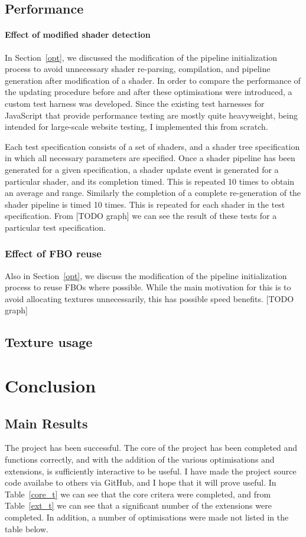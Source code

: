 \documentclass[12pt,twoside,notitlepage]{report}
\begin{document}
\section{Performance}
\subsubsection{Effect of modified shader detection}
In Section~\ref{opt}, we discussed the modification of the pipeline initialization process to avoid unnecessary shader re-parsing, compilation, and pipeline generation after modification of a shader. In order to compare the performance of the updating procedure before and after these optimisations were introduced, a custom test harness was developed. Since the existing test harnesses for JavaScript that provide performance testing are mostly quite heavyweight, being intended for large-scale website testing, I implemented this from scratch.

Each test specification consists of a set of shaders, and a shader tree specification in which all necessary parameters are specified. Once a shader pipeline has been generated for a given specification, a shader update event is generated for a particular shader, and its completion timed. This is repeated 10 times to obtain an average and range. Similarly the completion of a complete re-generation of the shader pipeline is timed 10 times. This is repeated for each shader in the test specification. From [TODO graph] we can see the result of these tests for a particular test specification.

\subsection{Effect of FBO reuse}
Also in Section~\ref{opt}, we discuss the modification of the pipeline initialization process to reuse FBOs where possible. While the main motivation for this is to avoid allocating textures unnecessarily, this has possible speed benefits. [TODO graph]

\section{Texture usage}

\cleardoublepage
\chapter{Conclusion}

\section{Main Results}
The project has been successful. The core of the project has been completed and functions correctly, and with the addition of the various optimisations and extensions, is sufficiently interactive to be useful. I have made the project source code availabe to others via GitHub, and I hope that it will prove useful. In Table~\ref{core_t} we can see that the core critera were completed, and from Table~\ref{ext_t} we can see that a significant number of the extensions were completed. In addition, a number of optimisations were made not listed in the table below.
\end{document}
